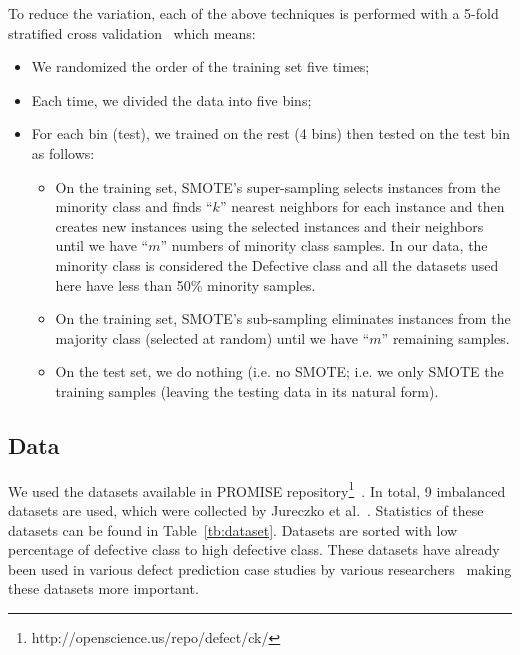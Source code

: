 \documentclass[sigconf,review, anonymous]{acmart}
\newcommand{\bi}{\begin{itemize}[leftmargin=0.4cm]}
\newcommand{\ei}{\end{itemize}}
\theoremstyle{break}
\theoremstyle{break}
\begin{document}
To reduce the variation, each of the above techniques is performed with a 5-fold stratified cross validation~\cite{refaeilzadeh2009cross} which means:
\bi
\item We randomized the order of the training set five times;
\item Each time, we divided the data into five bins;
\item For each bin (test), we trained on the rest (4 bins) then tested
on the test bin as follows:
\bi
\item
On the training set, SMOTE's super-sampling selects instances from the minority class and finds ``$k$'' nearest neighbors for each instance and then creates new instances using the selected instances and their neighbors until we have ``$m$'' numbers of minority class samples. 
In our data, 
 the minority class is considered the Defective class and all the datasets used here have less than 50\% minority samples.
\item
On the training set, SMOTE's sub-sampling  eliminates instances from the majority class (selected at random)
until we have ``$m$'' remaining samples.
 
\item On the test set, we do nothing (i.e. no SMOTE;
i.e. we only SMOTE the training samples
(leaving the  testing data in its natural form).
\ei
\ei

\subsection{\textbf{Data}}
 We used the datasets available in PROMISE repository\footnote{http://openscience.us/repo/defect/ck/}~\cite{promiserepo}. In total, 9 imbalanced datasets are used, which were collected by Jureczko et al.~\cite{jureczko2010towards}. Statistics of these datasets can be found in Table~\ref{tb:dataset}. Datasets are sorted with low percentage of defective class to high defective class. These datasets have already been used in various defect prediction case studies by various researchers~\cite{he2012investigation,peters2013better,peters2013balancing,turhan2013empirical} making these datasets more important.
 
\end{document}
